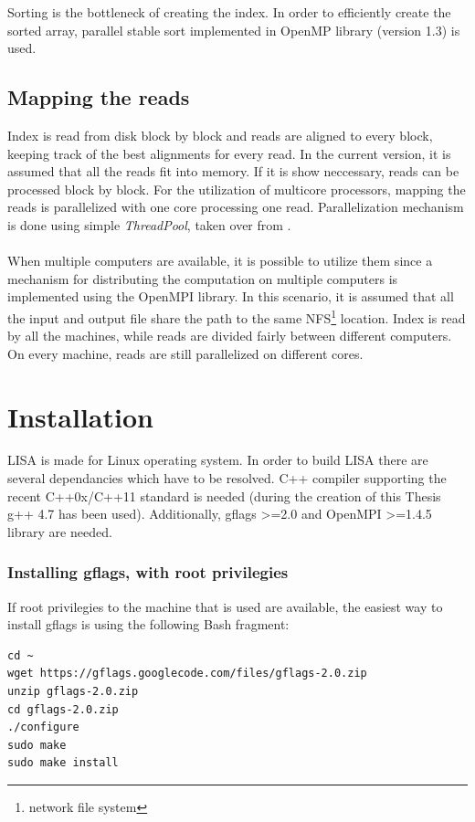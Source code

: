 \documentclass[times, utf8, diplomski]{fer}
\begin{document}
Sorting is the bottleneck of creating the index. In order to efficiently create the sorted array, parallel stable sort implemented in OpenMP library (version 1.3) is used. 

\subsection{Mapping the reads}

Index is read from disk block by block and reads are aligned to every block, keeping track of the best alignments for every read. In the current version, it is assumed that all the reads fit into memory. If it is show neccessary, reads can be processed block by block. For the utilization of multicore processors, mapping the reads is parallelized with one core processing one read. Parallelization mechanism is done using simple \emph{ThreadPool}, taken over from \cite{thread.pool}.\\
\\
When multiple computers are available, it is possible to utilize them since a mechanism for distributing the computation on multiple computers is implemented using the OpenMPI \cite{gabriel04:_open_mpi} library. In this scenario, it is assumed that all the input and output file share the path to the same NFS\footnote{network file system} location. Index is read by all the machines, while reads are divided fairly between different computers. On every machine, reads are still parallelized on different cores.

\section{Installation}

LISA is made for Linux operating system. In order to build LISA there are several dependancies which have to be resolved. C++ compiler supporting the recent C++0x/C++11 standard is needed (during the creation of this Thesis g++ 4.7 has been used). Additionally, gflags >=2.0\cite{gflags} and OpenMPI >=1.4.5 library are needed.

\subsubsection{Installing gflags, with root privilegies}

If root privilegies to the machine that is used are available, the easiest way to install gflags is using the following Bash fragment:

\begin{lstlisting}
cd ~
wget https://gflags.googlecode.com/files/gflags-2.0.zip
unzip gflags-2.0.zip
cd gflags-2.0.zip
./configure
sudo make
sudo make install
\end{lstlisting}
\end{document}
